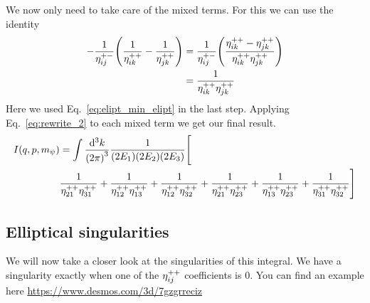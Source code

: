 We now only need to take care of the mixed terms. For this we can use the identity
\begin{align}
    -\frac{1}{\eta_{ij}^{+-}} \qty(\frac{1}{\eta_{ik}^{++}}-\frac{1}{\eta_{jk}^{++}})
&= \frac{1}{\eta_{ij}^{+-}} \qty(\frac{\eta_{ik}^{++}-\eta_{jk}^{++}}{\eta_{ik}^{++}\eta_{jk}^{++}})\\
&= \frac{1}{\eta_{ik}^{++}\eta_{jk}^{++}} \label{eq:rewrite_2}
\end{align}
Here we used Eq.~\eqref{eq:elipt_min_elipt} in the last step.
Applying Eq.~\eqref{eq:rewrite_2} to each mixed term we get our final result.
\begin{align*}
I(q,p,m_\psi)
&=  \int \frac{\dd[3]{k}}{{(2\pi)}^3} \frac{1}{(2E_1)(2E_2)(2E_3)} \Bigg[\\
  &\frac{1}{\eta_{21}^{++}\eta_{31}^{++}}
+ \frac{1}{\eta_{12}^{++}\eta_{13}^{++}}
+ \frac{1}{\eta_{12}^{++}\eta_{32}^{++}}
+ \frac{1}{\eta_{21}^{++}\eta_{23}^{++}}
+ \frac{1}{\eta_{13}^{++}\eta_{23}^{++}}
+ \frac{1}{\eta_{31}^{++}\eta_{32}^{++}}
\Bigg]
\end{align*}
\subsection{Elliptical singularities}
We will now take a closer look at the singularities of this integral. We have a singularity exactly when one of the $\eta_{ij}^{++}$ coefficients is $0$.
You can find an example here \url{https://www.desmos.com/3d/7gzgrreciz}
